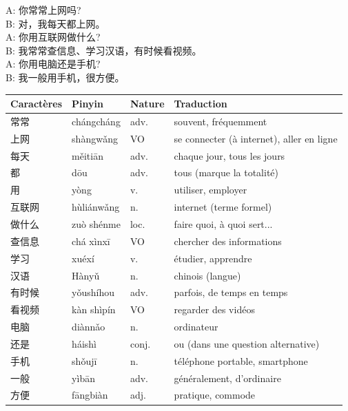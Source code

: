 \documentclass[11pt]{article}
\begin{document}
\begin{textebox}
A: 你常常上网吗? \\
B: 对，我每天都上网。 \\
A: 你用互联网做什么? \\
B: 我常常查信息、学习汉语，有时候看视频。 \\
A: 你用电脑还是手机? \\
B: 我一般用手机，很方便。
\end{textebox}

\begin{center}
\begin{tabularx}{\linewidth}{|X|X|X|X|}
\hline
\rowcolor{popblueL} \textbf{Caractères} & \textbf{Pinyin} & \textbf{Nature} & \textbf{Traduction} \\
\hline
常常 & chángcháng & adv. & souvent, fréquemment \\
\hline
上网 & shàngwǎng & VO & se connecter (à internet), aller en ligne \\
\hline
每天 & měitiān & adv. & chaque jour, tous les jours \\
\hline
都 & dōu & adv. & tous (marque la totalité) \\
\hline
用 & yòng & v. & utiliser, employer \\
\hline
互联网 & hùliánwǎng & n. & internet (terme formel) \\
\hline
做什么 & zuò shénme & loc. & faire quoi, à quoi sert... \\
\hline
查信息 & chá xìnxī & VO & chercher des informations \\
\hline
学习 & xuéxí & v. & étudier, apprendre \\
\hline
汉语 & Hànyǔ & n. & chinois (langue) \\
\hline
有时候 & yǒushíhou & adv. & parfois, de temps en temps \\
\hline
看视频 & kàn shìpín & VO & regarder des vidéos \\
\hline
电脑 & diànnǎo & n. & ordinateur \\
\hline
还是 & háishì & conj. & ou (dans une question alternative) \\
\hline
手机 & shǒujī & n. & téléphone portable, smartphone \\
\hline
一般 & yìbān & adv. & généralement, d'ordinaire \\
\hline
方便 & fāngbiàn & adj. & pratique, commode \\
\hline
\end{tabularx}
\end{center}
\end{document}
